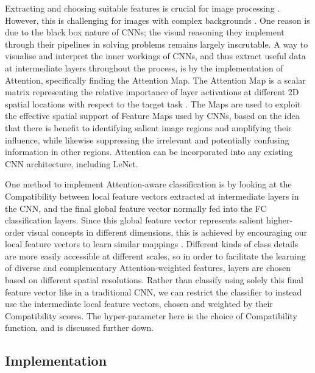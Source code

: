 \documentclass[11pt]{article}
\begin{document}
Extracting and choosing suitable features is crucial for image processing \cite{du}. However, this is challenging for images with complex backgrounds \cite{li}. One reason is due to the black box nature of CNNs; the visual reasoning they implement through their pipelines in solving problems remains largely inscrutable. A way to visualise and interpret the inner workings of CNNs, and thus extract useful data at intermediate layers throughout the process, is by the implementation of Attention, specifically finding the Attention Map. The Attention Map is a scalar matrix representing the relative importance of layer activations at different 2D spatial locations with respect to the target task \cite{simonyan1}. The Maps are used to exploit the effective spatial support of Feature Maps used by CNNs, based on the idea that there is benefit to identifying salient image regions and amplifying their influence, while likewise suppressing the irrelevant and potentially confusing information in other regions. Attention can be incorporated into any existing CNN architecture, including LeNet. \newline

One method to implement Attention-aware classification is by looking at the Compatibility between local feature vectors extracted at intermediate layers in the CNN, and the final global feature vector normally fed into the FC classification layers. Since this global feature vector represents salient higher-order visual concepts in different dimensions, this is achieved by encouraging our local feature vectors to learn similar mappings \cite{jetley}. Different kinds of class details are more easily accessible at different scales, so in order to facilitate the learning of diverse and complementary Attention-weighted features, layers are chosen based on different spatial resolutions. Rather than classify using solely this final feature vector like in a traditional CNN, we can restrict the classifier to instead use the intermediate local feature vectors, chosen and weighted by their Compatibility scores. The hyper-parameter here is the choice of Compatibility function, and is discussed further down.

\subsection{Implementation}
\end{document}
